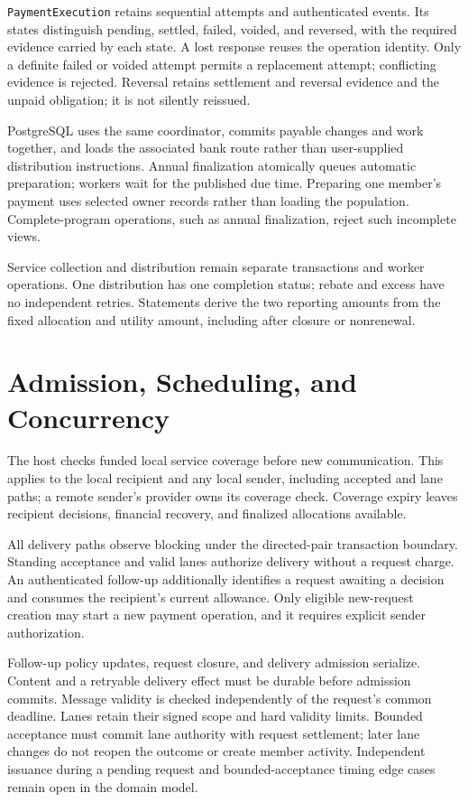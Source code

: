 \documentclass[11pt]{article}
\begin{document}
\texttt{PaymentExecution} retains sequential attempts and authenticated events.
Its states distinguish pending, settled, failed, voided, and reversed, with the
required evidence carried by each state. A lost response reuses the operation
identity. Only a definite failed or voided attempt permits a replacement attempt;
conflicting evidence is rejected. Reversal retains settlement and reversal
evidence and the unpaid obligation; it is not silently reissued.

PostgreSQL uses the same coordinator, commits payable changes and work together,
and loads the associated bank route rather than user-supplied distribution
instructions. Annual finalization atomically queues automatic preparation;
workers wait for the published due time. Preparing one member's payment uses
selected owner records rather than loading the population. Complete-program
operations, such as annual finalization, reject such incomplete views.

Service collection and distribution remain separate transactions and worker
operations. One distribution has one completion status; rebate and excess have
no independent retries. Statements derive the two reporting amounts from the
fixed allocation and utility amount, including after closure or nonrenewal.

\section{Admission, Scheduling, and Concurrency}

The host checks funded local service coverage before new communication. This
applies to the local recipient and any local sender, including accepted and lane
paths; a remote sender's provider owns its coverage check. Coverage expiry leaves
recipient decisions, financial recovery, and finalized allocations available.

All delivery paths observe blocking under the directed-pair transaction boundary.
Standing acceptance and valid lanes authorize delivery without a request charge.
An authenticated follow-up additionally identifies a request awaiting a decision and consumes
the recipient's current allowance. Only eligible new-request creation may start
a new payment operation, and it requires explicit sender authorization.

Follow-up policy updates, request closure, and delivery admission serialize.
Content and a retryable delivery effect must be durable before admission commits.
Message validity is checked independently of the request's common deadline.
Lanes retain their signed scope and hard validity limits. Bounded acceptance must
commit lane authority with request settlement; later lane changes do not reopen
the outcome or create member activity. Independent issuance during a pending
request and bounded-acceptance timing edge cases remain open in the domain model.
\end{document}
